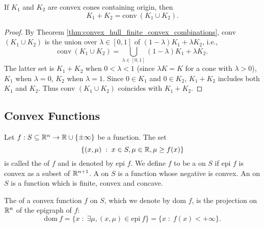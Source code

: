 \documentclass[11pt,a4paper]{article}
\begin{document}
\begin{theorem}
    If $K_1$ and $K_2$ are convex cones containing origin, then
    \begin{equation*}
        K_1+K_2 = \mathrm{conv}\ (K_1\cup K_2).
    \end{equation*} 
\end{theorem}

\begin{proof}
    By Theorem \ref{thm:convex_hull_finite_convex_combinations}, conv $(K_1\cup K_2)$ is the union over $\lambda\in [0,1]$ of $(1-\lambda)K_1 + \lambda K_2$, i.e.,
    \begin{equation*}
        \mathrm{conv}\ (K_1\cup K_2) = \bigcup_{\lambda\in [0,1]} (1-\lambda)K_1 + \lambda K_2.
    \end{equation*}
    The latter set is $K_1+K_2$ when $0<\lambda<1$ (since $\lambda K = K$ for a cone with $\lambda>0$), $K_1$ when $\lambda = 0$, $K_2$ when $\lambda = 1$. Since $0\in K_1$ and $0\in K_2$, $K_1+K_2$ includes both $K_1$ and $K_2$. Thus conv $(K_1\cup K_2)$ coincides with $K_1+K_2$.
\end{proof}

\subsection{Convex Functions}

\begin{definition}
    Let $f:S\subseteq \mathbb{R}^n\rightarrow \mathbb{R}\cup \{\pm \infty\}$ be a function. The set 
    \begin{equation*}
        \{(x,\mu)\;:\; x\in S,\mu\in \mathbb{R},\mu\ge f(x)\}
    \end{equation*}
    is called the  of $f$ and is denoted by epi $f$. We define $f$ to be a  on $S$ if epi $f$ is convex as a subset of $\mathbb{R}^{n+1}$. A  on $S$ is a function whose negative is convex. An  on $S$ is a function which is finite, convex and concave.
\end{definition}

\begin{definition}\label{def:effective_domain}
    The  of a convex function $f$ on $S$, which we denote by dom $f$, is the projection on $\mathbb{R}^n$ of the epigraph of $f$:
    \begin{equation*}
        \mathrm{dom}\ f = \{x\;:\;\exists \mu,(x,\mu)\in\mathrm{epi}\ f\} = \{x\;:\;f(x)<+\infty\}.
    \end{equation*}
\end{definition}
\end{document}

